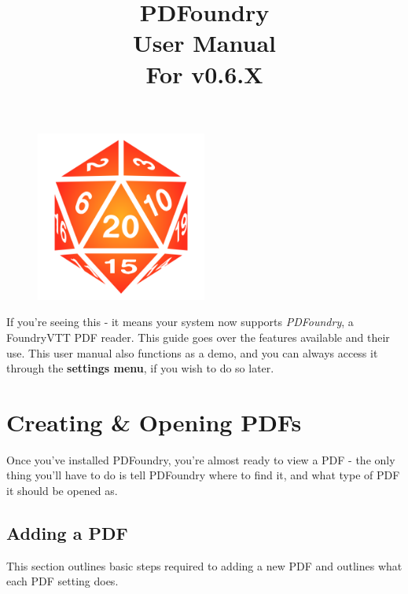 \documentclass{article}
\title{%
PDFoundry \\
\large User Manual\\
For v0.6.X}
\date{}
\author{}
\begin{document}
    \begin{figure}[t]
        \centering
        \includegraphics[width=0.5\textwidth]{images/fvtt-d20.png}
    \end{figure}
    \maketitle

    If you're seeing this - it means your system now supports \textit{PDFoundry}, a FoundryVTT PDF reader. This guide goes over the features available and their use. This user manual also functions as a demo, and you can always access it through the \textbf{settings menu}, if you wish to do so later.

    \tableofcontents

    \section{Creating \& Opening PDFs}
    \label{sec:creating-opening-pdfs}

    Once you've installed PDFoundry, you're almost ready to view a PDF - the only thing you'll have to do is tell PDFoundry where to find it, and what type of PDF it should be opened as.

    \subsection{Adding a PDF}
    This section outlines basic steps required to adding a new PDF and outlines what each PDF setting does.
\end{document}
